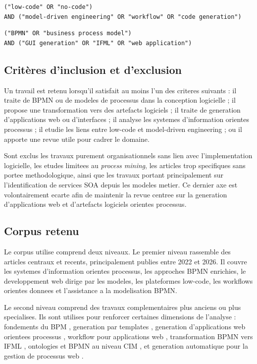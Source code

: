 \documentclass[12pt,a4paper]{article}
\begin{document}
\begin{verbatim}
("low-code" OR "no-code")
AND ("model-driven engineering" OR "workflow" OR "code generation")
\end{verbatim}

\begin{verbatim}
("BPMN" OR "business process model")
AND ("GUI generation" OR "IFML" OR "web application")
\end{verbatim}

\subsection{Critères d'inclusion et d'exclusion}

Un travail est retenu lorsqu'il satisfait au moins l'un des criteres suivants : il traite de BPMN ou de modeles de processus dans la conception logicielle ; il propose une transformation vers des artefacts logiciels ; il traite de generation d'applications web ou d'interfaces ; il analyse les systemes d'information orientes processus ; il etudie les liens entre low-code et model-driven engineering ; ou il apporte une revue utile pour cadrer le domaine.

Sont exclus les travaux purement organisationnels sans lien avec l'implementation logicielle, les etudes limitees au \textit{process mining}, les articles trop specifiques sans portee methodologique, ainsi que les travaux portant principalement sur l'identification de services SOA depuis les modeles metier. Ce dernier axe est volontairement ecarte afin de maintenir la revue centree sur la generation d'applications web et d'artefacts logiciels orientes processus.

\subsection{Corpus retenu}

Le corpus utilise comprend deux niveaux. Le premier niveau rassemble des articles centraux et recents, principalement publies entre 2022 et 2026. Il couvre les systemes d'information orientes processus, les approches BPMN enrichies, le developpement web dirige par les modeles, les plateformes low-code, les workflows orientes donnees et l'assistance a la modelisation BPMN.

Le second niveau comprend des travaux complementaires plus anciens ou plus specialises. Ils sont utilises pour renforcer certaines dimensions de l'analyse : fondements du BPM \cite{aalst2013}, generation par templates \cite{syriani2018}, generation d'applications web orientees processus \cite{hoyos2017}, workflow pour applications web \cite{hemel2008}, transformation BPMN vers IFML \cite{sajji2022}, ontologies et BPMN au niveau CIM \cite{laaz2020}, et generation automatique pour la gestion de processus web \cite{uyanik2023}.
\end{document}
